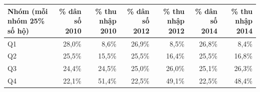 \begin{tabular}{lrrrrrr}
\toprule
Nhóm (mỗi nhóm 25\% số hộ) & \% dân số 2010 & \% thu nhập 2010 & \% dân số 2012 & \% thu nhập 2012 & \% dân số 2014 & \% thu nhập 2014 \\
\midrule
Q1 & 28,0\% & 8,6\% & 26,9\% & 8,5\% & 26,8\% & 8,4\% \\
Q2 & 25,5\% & 15,5\% & 25,5\% & 16,4\% & 25,5\% & 16,8\% \\
Q3 & 24,4\% & 24,5\% & 25,0\% & 26,0\% & 25,1\% & 26,3\% \\
Q4 & 22,1\% & 51,4\% & 22,5\% & 49,1\% & 22,5\% & 48,4\% \\
\bottomrule
\end{tabular}
